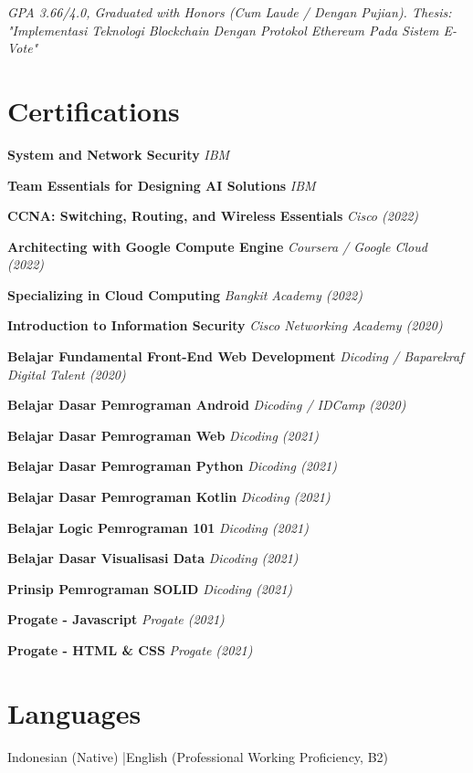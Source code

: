 \documentclass[11pt,a4paper]{article}
\newcommand{\certentry}[2]{%
    \textbf{#1} \hfill \textit{#2}
}
\begin{document}
\textit{GPA 3.66/4.0, Graduated with Honors (Cum Laude / Dengan Pujian). Thesis: "Implementasi Teknologi Blockchain Dengan Protokol Ethereum Pada Sistem E-Vote"}

\section*{Certifications}

\certentry{System and Network Security}{IBM}

\certentry{Team Essentials for Designing AI Solutions}{IBM}

\certentry{CCNA: Switching, Routing, and Wireless Essentials}{Cisco (2022)}

\certentry{Architecting with Google Compute Engine}{Coursera / Google Cloud (2022)}

\certentry{Specializing in Cloud Computing}{Bangkit Academy (2022)}

\certentry{Introduction to Information Security}{Cisco Networking Academy (2020)}

\certentry{Belajar Fundamental Front-End Web Development}{Dicoding / Baparekraf Digital Talent (2020)}

\certentry{Belajar Dasar Pemrograman Android}{Dicoding / IDCamp (2020)}

\certentry{Belajar Dasar Pemrograman Web}{Dicoding (2021)}

\certentry{Belajar Dasar Pemrograman Python}{Dicoding (2021)}

\certentry{Belajar Dasar Pemrograman Kotlin}{Dicoding (2021)}

\certentry{Belajar Logic Pemrograman 101}{Dicoding (2021)}

\certentry{Belajar Dasar Visualisasi Data}{Dicoding (2021)}

\certentry{Prinsip Pemrograman SOLID}{Dicoding (2021)}

\certentry{Progate - Javascript}{Progate (2021)}

\certentry{Progate - HTML \& CSS}{Progate (2021)}

\section*{Languages}

Indonesian (Native) \quad|\quad English (Professional Working Proficiency, B2)
\end{document}
